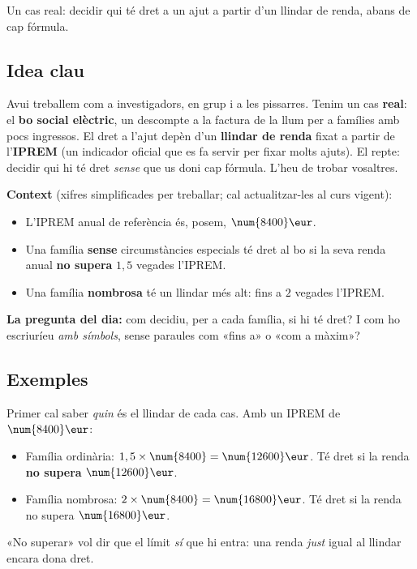 %
{Un cas real: decidir qui té dret a un ajut a partir d'un llindar de renda, abans de cap fórmula.}

\subsection{Idea clau}

Avui treballem com a investigadors, en grup i a les pissarres. Tenim un cas
\textbf{real}: el \textbf{bo social elèctric}, un descompte a la factura de la llum
per a famílies amb pocs ingressos. El dret a l'ajut depèn d'un \textbf{llindar de
renda} fixat a partir de l'\textbf{IPREM} (un indicador oficial que es fa servir per
fixar molts ajuts). El repte: decidir qui hi té dret \emph{sense} que us doni cap
fórmula. L'heu de trobar vosaltres.

\begin{idea}
\textbf{Context} (xifres simplificades per treballar; cal actualitzar-les al curs vigent):
\begin{itemize}[leftmargin=1.4em, itemsep=2pt]
  \item L'IPREM anual de referència és, posem, $\num{8400}\eur$.
  \item Una família \textbf{sense} circumstàncies especials té dret al bo si la seva
        renda anual \textbf{no supera} $1,5$ vegades l'IPREM.
  \item Una família \textbf{nombrosa} té un llindar més alt: fins a $2$ vegades l'IPREM.
\end{itemize}
\textbf{La pregunta del dia:} com decidiu, per a cada família, si hi té dret? I com
ho escriuríeu \emph{amb símbols}, sense paraules com «fins a» o «com a màxim»?
\end{idea}

\subsection{Exemples}

\begin{exemple}
Primer cal saber \emph{quin} és el llindar de cada cas. Amb un IPREM de $\num{8400}\eur$:
\begin{itemize}[leftmargin=1.4em, itemsep=2pt]
  \item Família ordinària: $1,5\times\num{8400}=\num{12600}\eur$. Té dret si la renda
        \textbf{no supera} $\num{12600}\eur$.
  \item Família nombrosa: $2\times\num{8400}=\num{16800}\eur$. Té dret si la renda no
        supera $\num{16800}\eur$.
\end{itemize}
«No superar» vol dir que el límit \emph{sí} que hi entra: una renda \emph{just} igual
al llindar encara dona dret.
\end{exemple}

